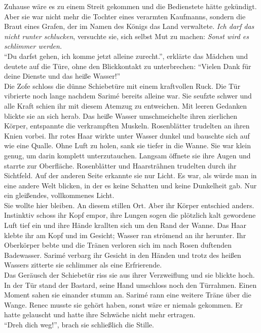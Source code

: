 Zuhause wäre es zu einem Streit gekommen und die Bedienstete hätte gekündigt. Aber sie war nicht 
mehr die Tochter eines verarmten Kaufmanns, sondern die Braut eines Grafen, der im Namen des Königs 
das Land verwaltete. \textit{Ich darf das nicht runter schlucken}, versuchte sie, sich 
selbst Mut zu machen: \textit{Sonst wird es schlimmer werden.}\\
``Du darfst gehen, ich komme jetzt alleine zurecht.'', erklärte das Mädchen und deutete auf die 
Türe, ohne den Blickkontakt zu unterbrechen: ``Vielen Dank für deine Dienste und das heiße 
Wasser!''\\
Die Zofe schloss die dünne Schiebetüre mit einem kraftvollen Ruck. Die Tür vibrierte noch lange 
nachdem Sarimé bereits alleine war. Sie seufzte schwer und alle Kraft schien ihr mit diesem Atemzug 
zu entweichen. Mit leeren Gedanken blickte sie an sich herab. Das heiße Wasser umschmeichelte ihren 
zierlichen Körper, entspannte die verkrampften Muskeln. Rosenblätter trudelten an ihren Knien 
vorbei. Ihr rotes Haar wirkte unter Wasser dunkel und bauschte sich auf wie eine Qualle. Ohne Luft 
zu holen, sank sie tiefer in die Wanne. Sie war klein genug, um darin komplett unterzutauchen. 
Langsam öffnete sie ihre Augen und starrte zur Oberfläche. Rosenblätter und Haarsträhnen trudelten 
durch ihr Sichtfeld. Auf der anderen Seite erkannte sie nur Licht. Es war, als würde man in eine 
andere Welt blicken, in der es keine Schatten und keine Dunkelheit gab. Nur ein gleißendes, 
vollkommenes Licht. \\
Sie wollte hier bleiben. An diesem stillen Ort. Aber ihr Körper entschied anders. Instinktiv schoss 
ihr Kopf empor, ihre Lungen sogen die plötzlich kalt gewordene Luft tief ein und ihre Hände 
krallten sich um den Rand der Wanne. Das Haar klebte ihr am Kopf und im Gesicht; Wasser ran 
strömend an ihr herunter. Ihr Oberkörper bebte und die Tränen verloren sich im nach Rosen duftenden 
Badewasser. Sarimé verbarg ihr Gesicht in den Händen und trotz des heißen Wassers zitterte sie 
schlimmer als eine Erfrierende.\\
Das Geräusch der Schiebetür riss sie aus ihrer Verzweiflung und sie blickte hoch. In der Tür stand 
der Bastard, seine Hand umschloss noch den Türrahmen. Einen Moment sahen sie einander stumm an. 
Sarimé rann eine weitere Träne über die Wange. Renec musste sie gehört haben, sonst wäre er niemals 
gekommen. Er hatte gelauscht und hatte ihre Schwäche nicht mehr ertragen.\\
``Dreh dich weg!'', brach sie schließlich die Stille.\\
